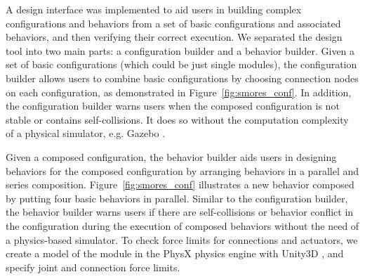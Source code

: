 \documentclass[graybox]{svmult}
\newcommand{\TODO}[1]{ {\bf \textcolor{red}{TODO:} #1 }}
\begin{document}

A design interface was implemented to aid users in building complex configurations and behaviors from a set of basic configurations and associated behaviors,
and then verifying their correct execution. We separated the design tool into two main parts: a configuration builder and a behavior builder.
Given a set of basic configurations (which could be just single modules), the configuration builder allows users to combine basic configurations by choosing connection nodes on each configuration, as demonstrated in Figure~\ref{fig:smores_conf}. In addition, the configuration builder warns users when the composed configuration is not stable or contains self-collisions. It does so without the computation complexity of a physical simulator, e.g. Gazebo
\cite{koenig2004design}.

Given a composed configuration, the behavior builder aids users in designing behaviors for the composed configuration by arranging behaviors in a parallel and series composition. Figure~\ref{fig:smores_conf} illustrates a new behavior composed by putting four basic behaviors in parallel. Similar to the configuration builder, the behavior builder warns users if there are self-collisions or behavior conflict in the configuration during the execution of composed behaviors without the need of a physics-based simulator. To check force limits for connections and actuators, we create a
model of the module in the PhysX \cite{PhysX} physics engine with Unity3D \cite{Unity}, and specify joint and connection
force limits. 
\end{document}
